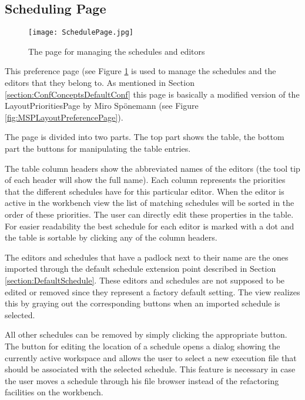 \subsection{Scheduling Page}
\label{section:SchedulingPage}
\begin{figure}
  \centering
  \texttt{[image: SchedulePage.jpg]}
  \caption[The page for managing the schedules and editors]%
  {The page for managing the schedules and editors\protect}
  \label{fig:SchedulePage}
\end{figure}
This preference page (see Figure \ref{fig:SchedulePage} is used to manage the schedules and the editors that they belong to.
As mentioned in Section \ref{section:ConfConceptsDefaultConf} this page is basically a modified version 
of the LayoutPrioritiesPage by Miro Sp\"onemann (see Figure \ref{fig:MSPLayoutPreferencePage}).

The page is divided into two parts. The top part shows the table, the bottom part the buttons for manipulating
the table entries.

The table column headers show the abbreviated names of the editors (the tool tip of each header will show the full name). 
Each column represents the priorities that the different schedules have for this particular editor. When the editor is
active in the workbench view the list of matching schedules will be sorted in the order of these priorities. The user
can directly edit these properties in the table. For easier readability the best schedule for each editor is marked
with a dot and the table is sortable by clicking any of the column headers.

The editors and schedules that have a padlock next to their name are the ones imported through the default schedule 
extension point described in Section \ref{section:DefaultSchedule}. These editors and schedules are not supposed
to be edited or removed since they represent a factory default setting. The view realizes this by graying out the 
corresponding buttons when an imported schedule is selected.

All other schedules can be removed by simply clicking the appropriate button. The button for editing the location
of a schedule opens a dialog showing the currently active workspace and allows the user to select a new
execution file that should be associated with the selected schedule. This feature is necessary in case the user
moves a schedule through his file browser instead of the refactoring facilities on the workbench.

